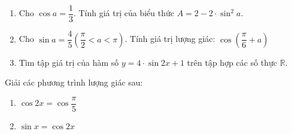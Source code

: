 \begin{bt}%
	\begin{enumerate}
		\item Cho $\cos a=\dfrac{1}{3}$. Tính giá trị của biểu thức $A=2-2 \cdot \sin ^2 a$.
		\item Cho $\sin a=\dfrac{4}{5}\left(\dfrac{\pi}{2}<a<\pi\right)$. Tính giá trị lượng giác: $\cos \left(\dfrac{\pi}{6}+a\right)$
		\item Tìm tập giá trị của hàm số $y=4 \cdot \sin 2 x+1$ trên tập hợp các số thực $\mathbb{R}$.
	\end{enumerate}
\end{bt}

\begin{bt}%
	Giải các phương trình lượng giác sau:
	\begin{enumerate}
		\item $\cos 2 x=\cos \dfrac{\pi}{5}$
		\item $\sin x=\cos 2 x$
	\end{enumerate}
\end{bt}

